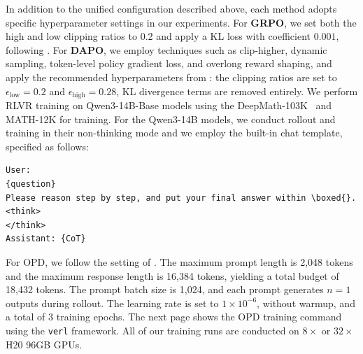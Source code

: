 \documentclass{llmxive}
\begin{document}
In addition to the unified configuration described above, each method adopts specific hyperparameter settings in our experiments. For \textbf{GRPO}, we set both the high and low clipping ratios to 0.2 and apply a KL loss with coefficient $0.001$, following \cite{deepseekai2025deepseekr1incentivizingreasoningcapability}. For \textbf{DAPO}, we employ techniques such as clip-higher, dynamic sampling, token-level policy gradient loss, and overlong reward shaping, and apply the recommended hyperparameters from \cite{yu2025dapoopensourcellmreinforcement}: the clipping ratios are set to $\epsilon_{\text{low}} = 0.2$ and $\epsilon_{\text{high}} = 0.28$, KL divergence terms are removed entirely. We perform RLVR training on Qwen3-14B-Base models using the DeepMath-103K~\citep{he2025deepmath103klargescalechallengingdecontaminated} and MATH-12K \citep{lightman2023lets} for training. For the Qwen3-14B models, we conduct rollout and training in their non-thinking mode and we employ the built-in chat template, specified as follows:

\begin{verbatim}
User: 
{question} 
Please reason step by step, and put your final answer within \boxed{}.
<think>
</think>
Assistant: {CoT}
\end{verbatim}



For OPD, we follow the setting of \citet{Yang2026LearningBT}. The maximum prompt length is 2{,}048 tokens and the maximum response length is 16{,}384 tokens, yielding a total budget of 18{,}432 tokens. The prompt batch size is 1{,}024, and each prompt generates $n = 1$ outputs during rollout. The learning rate is set to $1 \times 10^{-6}$, without warmup, and a total of 3 training epochs. The next page shows the OPD training command using the \texttt{verl} framework. All of our training runs are conducted on $8\times$ or $32\times$ H20 96GB GPUs.
\end{document}
